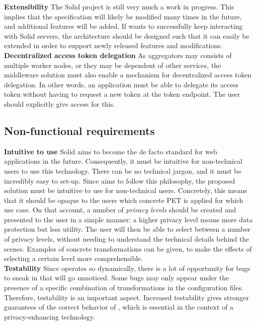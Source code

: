 \noindent \textbf{Extensibility} The Solid project is still very much a work in progress. This implies that the specification will likely be modified many times in the future, and additional features will be added. If \middleware{} wants to successfully keep interacting with Solid servers, the architecture should be designed such that it can easily be extended in order to support newly released features and modifications. \\

\noindent \textbf{Decentralized access token delegation} As aggregators may consists of multiple worker nodes, or they may be dependent of other services, the middleware solution must also enable a mechanism for decentralized access token delegation. In other words, an application must be able to delegate its access token without having to request a new token at the token endpoint. The user should explicitly give access for this.

\subsection{Non-functional requirements}
\textbf{Intuitive to use} Solid aims to become the de facto standard for web applications in the future. Consequently, it must be intuitive for non-technical users to use this technology. There can be no technical jargon, and it must be incredibly easy to set-up. Since \middleware{} aims to follow this philosophy, the proposed solution must be intuitive to use for non-technical users.  Concretely, this means that it should be opaque to the users which concrete PET is applied for which use case. On that account, a number of \textit{privacy levels} should be created and presented to the user in a simple manner: a higher privacy level means more data protection but less utility. The user will then be able to select between a number of privacy levels, without needing to understand the technical details behind the scenes. Examples of concrete transformations can be given, to make the effects of selecting a certain level more comprehensible. \\

\noindent \textbf{Testability} Since \middleware{} operates so dynamically, there is a lot of opportunity for bugs to sneak in that will go unnoticed. Some bugs may only appear under the presence of a specific combination of transformations in the configuration files. Therefore, testability is an important aspect. Increased testability gives stronger guarantees of the correct behavior of \middleware{}, which is essential in the context of a privacy-enhancing technology. \\

